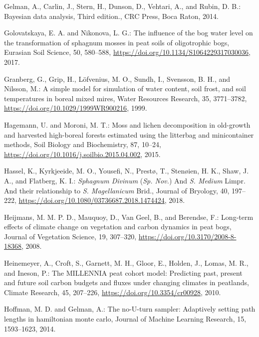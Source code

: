 \documentclass[
  12pt,
]{article}
\newlength{\cslhangindent}
\newlength{\cslentryspacingunit} %
\newenvironment{CSLReferences}[2] %
 {%
  \setlength{\parindent}{0pt}
  \ifodd #1
  \let\oldpar\par
  \def\par{\hangindent=\cslhangindent\oldpar}
  \fi
  \setlength{\parskip}{#2\cslentryspacingunit}
 }%
 {}
\begin{document}
\begin{CSLReferences}{0}{0}
\leavevmode{}%
Gelman, A., Carlin, J., Stern, H., Dunson, D., Vehtari, A., and Rubin, D. B.: Bayesian data analysis, Third edition., CRC Press, Boca Raton, 2014.

\leavevmode{}%
Golovatskaya, E. A. and Nikonova, L. G.: The influence of the bog water level on the transformation of sphagnum mosses in peat soils of oligotrophic bogs, Eurasian Soil Science, 50, 580--588, \url{https://doi.org/10.1134/S1064229317030036}, 2017.

\leavevmode{}%
Granberg, G., Grip, H., Löfvenius, M. O., Sundh, I., Svensson, B. H., and Nilsson, M.: A simple model for simulation of water content, soil frost, and soil temperatures in boreal mixed mires, Water Resources Research, 35, 3771--3782, \url{https://doi.org/10.1029/1999WR900216}, 1999.

\leavevmode{}%
Hagemann, U. and Moroni, M. T.: Moss and lichen decomposition in old-growth and harvested high-boreal forests estimated using the litterbag and minicontainer methods, Soil Biology and Biochemistry, 87, 10--24, \url{https://doi.org/10.1016/j.soilbio.2015.04.002}, 2015.

\leavevmode{}%
Hassel, K., Kyrkjeeide, M. O., Yousefi, N., Prestø, T., Stenøien, H. K., Shaw, J. A., and Flatberg, K. I.: {\emph{Sphagnum Divinum}} ({\emph{Sp. Nov.}}) And {\emph{S}}{\emph{. Medium}} {Limpr}. And their relationship to {\emph{S}}{\emph{. Magellanicum}} {Brid}., Journal of Bryology, 40, 197--222, \url{https://doi.org/10.1080/03736687.2018.1474424}, 2018.

\leavevmode{}%
Heijmans, M. M. P. D., Mauquoy, D., Van Geel, B., and Berendse, F.: Long-term effects of climate change on vegetation and carbon dynamics in peat bogs, Journal of Vegetation Science, 19, 307--320, \url{https://doi.org/10.3170/2008-8-18368}, 2008.

\leavevmode{}%
Heinemeyer, A., Croft, S., Garnett, M. H., Gloor, E., Holden, J., Lomas, M. R., and Ineson, P.: The {MILLENNIA} peat cohort model: {Predicting} past, present and future soil carbon budgets and fluxes under changing climates in peatlands, Climate Research, 45, 207--226, \url{https://doi.org/10.3354/cr00928}, 2010.

\leavevmode{}%
Hoffman, M. D. and Gelman, A.: The no-{U-turn} sampler: {Adaptively} setting path lengths in hamiltonian monte carlo, Journal of Machine Learning Research, 15, 1593--1623, 2014.


\end{CSLReferences}
\end{document}
